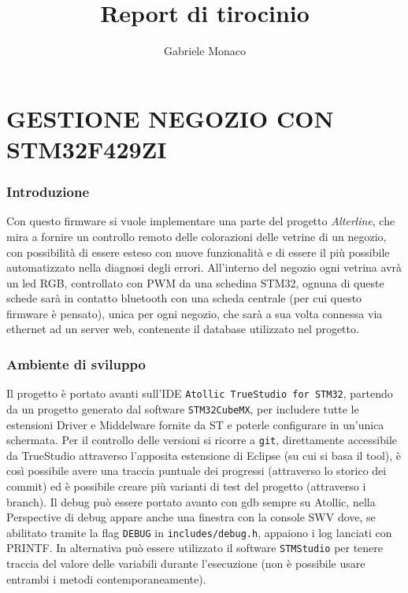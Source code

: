\documentclass{article}
\title{Report di tirocinio}
\author{Gabriele Monaco}
\begin{document}
\maketitle

\newpage

\tableofcontents

\newpage
\setlength{\parindent}{0pt}

\section{GESTIONE NEGOZIO CON STM32F429ZI}

\subsubsection{Introduzione}
Con questo firmware si vuole implementare una parte del progetto \textit{Alterline}, che mira a fornire un controllo remoto delle colorazioni delle vetrine di un negozio, con possibilit\`{a} di essere esteso con nuove funzionalit\`{a} e di essere il pi\`{u} possibile automatizzato nella diagnosi degli errori. All'interno del negozio ogni vetrina avr\`{a} un led RGB, controllato con PWM da una schedina STM32, ognuna di queste schede sar\`{a} in contatto bluetooth con una scheda centrale (per cui questo firmware \`{e} pensato), unica per ogni negozio, che sar\`{a} a sua volta connessa via ethernet ad un server web, contenente il database utilizzato nel progetto.
\subsubsection{Ambiente di sviluppo}
Il progetto \`{e} portato avanti sull'IDE \texttt{Atollic TrueStudio for STM32}, partendo da un progetto generato dal software \texttt{STM32CubeMX}, per includere tutte le estensioni Driver e Middelware fornite da ST e poterle configurare in un'unica schermata. Per il controllo delle versioni si ricorre a \texttt{git}, direttamente accessibile da TrueStudio attraverso l'apposita estensione di Eclipse (su cui si basa il tool), \`{e} cos\`{i} possibile avere una traccia puntuale dei progressi (attraverso lo storico dei commit) ed \`{e} possibile creare pi\`{u} varianti di test del progetto (attraverso i branch).
Il debug pu\`{o} essere portato avanto con gdb sempre su Atollic, nella Perspective di debug appare anche una finestra con la console SWV dove, se abilitato tramite la flag \texttt{DEBUG} in \texttt{includes/debug.h}, appaiono i log lanciati con PRINTF. In alternativa pu\`{o} essere utilizzato il software \texttt{STMStudio} per tenere traccia del valore delle variabili durante l'esecuzione (non \`{e} possibile usare entrambi i metodi contemporaneamente).
\end{document}
